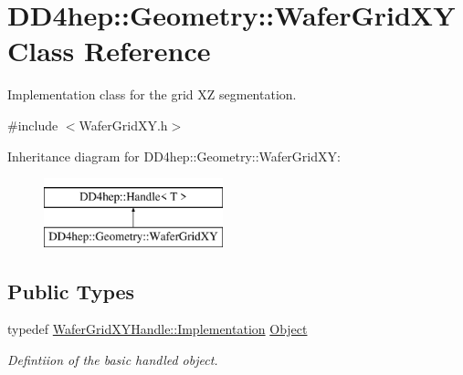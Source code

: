 \hypertarget{class_d_d4hep_1_1_geometry_1_1_wafer_grid_x_y}{}\section{D\+D4hep\+:\+:Geometry\+:\+:Wafer\+Grid\+XY Class Reference}
\label{class_d_d4hep_1_1_geometry_1_1_wafer_grid_x_y}


Implementation class for the grid XZ segmentation.  




{\ttfamily \#include $<$Wafer\+Grid\+X\+Y.\+h$>$}

Inheritance diagram for D\+D4hep\+:\+:Geometry\+:\+:Wafer\+Grid\+XY\+:\begin{figure}[H]
\begin{center}
\leavevmode
\includegraphics[height=2.000000cm]{class_d_d4hep_1_1_geometry_1_1_wafer_grid_x_y}
\end{center}
\end{figure}
\subsection*{Public Types}
\begin{DoxyCompactItemize}
\item 
typedef \hyperlink{class_d_d4hep_1_1_handle_ad7ff728a25806079516b8965b9113f1a}{Wafer\+Grid\+X\+Y\+Handle\+::\+Implementation} \hyperlink{class_d_d4hep_1_1_geometry_1_1_wafer_grid_x_y_a94a234312cc2c123569319d3d33b24e0}{Object}
\begin{DoxyCompactList}\small\item\em Defintiion of the basic handled object. \end{DoxyCompactList}\end{DoxyCompactItemize}
